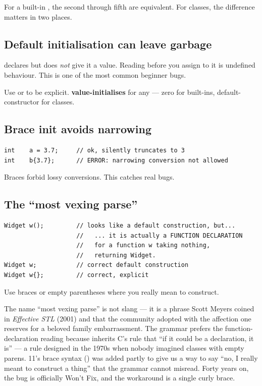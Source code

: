 For a built-in , the second through fifth are equivalent.
For classes, the difference matters in two places.

\subsection{Default initialisation can leave garbage}

 declares  but does \emph{not} give it a value.
Reading  before you assign to it is undefined behaviour.
This is one of the most common beginner bugs.

Use  or  to be explicit.
 \textbf{value-initialises}  for any 
--- zero for built-ins, default-constructor for classes.

\subsection{Brace init avoids narrowing}

\begin{lstlisting}
int    a = 3.7;     // ok, silently truncates to 3
int    b{3.7};      // ERROR: narrowing conversion not allowed
\end{lstlisting}

Braces forbid lossy conversions. This catches real bugs.

\subsection{The ``most vexing parse''}

\begin{lstlisting}
Widget w();         // looks like a default construction, but...
                    //   ... it is actually a FUNCTION DECLARATION
                    //   for a function w taking nothing,
                    //   returning Widget.
Widget w;           // correct default construction
Widget w{};         // correct, explicit
\end{lstlisting}

Use braces or empty parentheses where you really mean to construct.

\begin{funfact}
The name ``most vexing parse'' is not slang --- it is a phrase Scott
Meyers coined in \emph{Effective STL} (2001) and that the \cpp{}
community adopted with the affection one reserves for a beloved
family embarrassment. The grammar prefers the function-declaration
reading because \cpp{} inherits C's rule that ``if it could be a
declaration, it is'' --- a rule designed in the 1970s when nobody
imagined classes with empty parens. \cpp{}11's brace syntax
() was added partly to give us a way to say
``no, I really meant to construct a thing'' that the grammar cannot
misread. Forty years on, the bug is officially Won't Fix, and the
workaround is a single curly brace.
\end{funfact}


